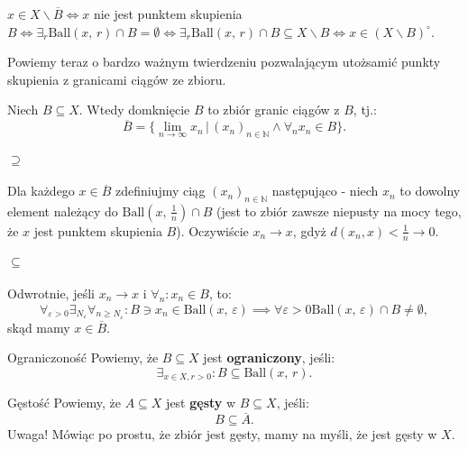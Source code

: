 \documentclass{article}
\newcounter{defi}
\numberwithin{defi}{section}
\numberwithin{defi}{section}
\newcommand{\N}{\mathbb{N}}
\newcommand{\oo}{\infty}
\newcommand{\dg}{^{\circ}}
\providecommand{\eps}{\varepsilon}
\providecommand{\dg}{^\circ}
\newcommand{\ciag}[1]{(#1_{n})_{n \in \N}}
\newcommand{\ball}[2]{\text{Ball}(#1, \, #2)}
\begin{document}
\begin{dow}
    $x \in X \backslash \overline{B} \iff x$ nie jest punktem skupienia $B \iff \exists_r \ball{x}{r} \cap B = \emptyset \iff \exists_r \ball{x}{r} \cap B \subseteq X \backslash B \iff x \in (X \backslash B) \dg$.
\end{dow}


Powiemy teraz o bardzo ważnym twierdzeniu pozwalającym utożsamić punkty skupienia z granicami ciągów ze zbioru.
\begin{twier}{}
    Niech $B \subseteq X$. Wtedy domknięcie $B$ to zbiór granic ciągów z $B$, tj.: \begin{equation}
        \overline{B} = \{ \lim_{n\to \oo} x_n \,  \big| \, \ciag{x} \wedge \forall_n x_n \in B \}.
    \end{equation}
\end{twier}

\begin{dow}
    \paragraph{$\supseteq$} Dla każdego $x \in \overline{B}$ zdefiniujmy ciąg $\ciag{x}$ następująco - niech $x_n$ to dowolny element należący do $\ball{x}{\frac{1}{n}} \cap B$ (jest to zbiór zawsze niepusty na mocy tego, że $x$ jest punktem skupienia $B$). Oczywiście $ x_n \to x$, gdyż $d(x_n, x) < \frac{1}{n} \to 0$.
    \paragraph{$\subseteq$} Odwrotnie, jeśli $x_n \to x$ i $\forall_n : x_n \in B$, to: \begin{equation}
        \forall_{\eps > 0} \exists_{N_\eps} \forall_{n \geqslant N_\eps}: B \ni x_n \in \ball{x}{\eps} \implies \forall{\eps >0} \ball{x}{\eps} \cap B \neq \emptyset,
    \end{equation} skąd mamy $x \in \overline{B}$.
\end{dow}

\begin{defr}{Ograniczoność}
    Powiemy, że $B \subseteq X$ jest \textbf{ograniczony}, jeśli: \begin{equation}
        \exists_{x \in X, r >0}: B \subseteq \ball{x}{r}.
    \end{equation}
\end{defr}

\begin{defr}{Gęstość}
    Powiemy, że $A \subseteq X$ jest \textbf{gęsty} w $B \subseteq X$, jeśli: \begin{equation}
        B \subseteq \overline{A}.
    \end{equation}
    Uwaga! Mówiąc po prostu, że zbiór jest gęsty, mamy na myśli, że jest gęsty w $X$.
\end{defr}
\end{document}
